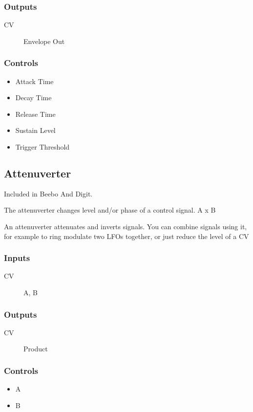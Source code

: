 \subsubsection{Outputs}
\begin{description}
\item [CV] Envelope Out
\end{description}

\subsubsection{Controls}
\begin{itemize}
\item Attack Time
\item Decay Time
\item Release Time
\item Sustain Level
\item Trigger Threshold
\end{itemize}

\subsection{Attenuverter}

Included in Beebo And Digit.

The attenuverter changes level and/or phase of a control signal. A x B

An attenuverter attenuates and inverts signals.
                  You can combine signals using it, for example to ring modulate two LFOs together, or just reduce the level of a CV

\subsubsection{Inputs}
\begin{description}
\item [CV] A, B
\end{description}

\subsubsection{Outputs}
\begin{description}
\item [CV] Product
\end{description}

\subsubsection{Controls}
\begin{itemize}
\item A
\item B
\end{itemize}

